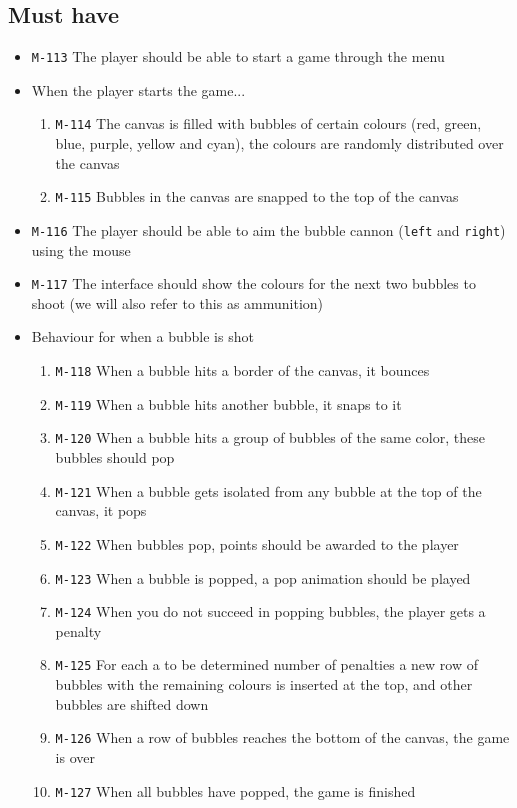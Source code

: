 \documentclass[a4paper]{article}
\begin{document}
\subsection{Must have}

\begin{itemize}
  \item \texttt{M-113} The player should be able to start a game through the menu

  \item When the player starts the game...
  \begin{enumerate}
    \item \texttt{M-114} The canvas is filled with bubbles of certain colours (red, green, blue, purple, yellow and cyan), the colours are randomly distributed over the canvas
    \item \texttt{M-115} Bubbles in the canvas are snapped to the top of the canvas
  \end{enumerate}
  
  \item \texttt{M-116} The player should be able to aim the bubble cannon (\texttt{left} and \texttt{right}) using the mouse
  \item \texttt{M-117} The interface should show the colours for the next two bubbles to shoot (we will also refer to this as ammunition)


  \item Behaviour for when a bubble is shot
  \begin{enumerate}
    \item \texttt{M-118} When a bubble hits a border of the canvas, it bounces
    \item \texttt{M-119} When a bubble hits another bubble, it snaps to it
    \item \texttt{M-120} When a bubble hits a group of bubbles of the same color, these bubbles should pop
    \item \texttt{M-121} When a bubble gets isolated from any bubble at the top of the canvas, it pops
    \item \texttt{M-122} When bubbles pop, points should be awarded to the player
    \item \texttt{M-123} When a bubble is popped, a pop animation should be played
    \item \texttt{M-124} When you do not succeed in popping bubbles, the player gets a penalty
    \item \texttt{M-125} For each a to be determined number of penalties a new row of bubbles with the remaining colours is inserted at the top, and other bubbles are shifted down
    \item \texttt{M-126} When a row of bubbles reaches the bottom of the canvas, the game is over
    \item \texttt{M-127} When all bubbles have popped, the game is finished
  \end{enumerate}
  

\end{itemize}
\end{document}
